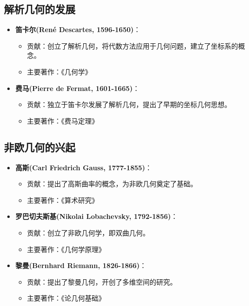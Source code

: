 \documentclass{Math_Note}
\begin{document}
\subsection{解析几何的发展}
\begin{itemize}
    \item \textbf{笛卡尔(René Descartes, 1596-1650)}：
    \begin{itemize}
        \item 贡献：创立了解析几何，将代数方法应用于几何问题，建立了坐标系的概念。
        \item 主要著作：《几何学》
    \end{itemize}
    
    \item \textbf{费马(Pierre de Fermat, 1601-1665)}：
    \begin{itemize}
        \item 贡献：独立于笛卡尔发展了解析几何，提出了早期的坐标几何思想。
        \item 主要著作：《费马定理》
    \end{itemize}
\end{itemize}

\subsection{非欧几何的兴起}
\begin{itemize}
    \item \textbf{高斯(Carl Friedrich Gauss, 1777-1855)}：
    \begin{itemize}
        \item 贡献：提出了高斯曲率的概念，为非欧几何奠定了基础。
        \item 主要著作：《算术研究》
    \end{itemize}
    
    \item \textbf{罗巴切夫斯基(Nikolai Lobachevsky, 1792-1856)}：
    \begin{itemize}
        \item 贡献：创立了非欧几何学，即双曲几何。
        \item 主要著作：《几何学原理》
    \end{itemize}
    
    \item \textbf{黎曼(Bernhard Riemann, 1826-1866)}：
    \begin{itemize}
        \item 贡献：提出了黎曼几何，开创了多维空间的研究。
        \item 主要著作：《论几何基础》
    \end{itemize}
\end{itemize}
\end{document}
